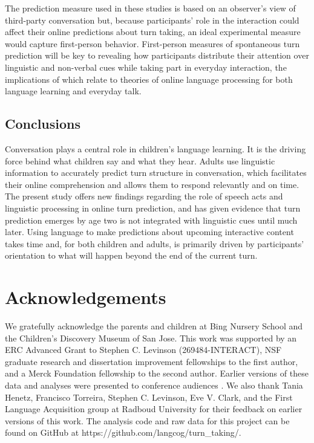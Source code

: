 \documentclass[authoryear, 12pt]{elsarticle}
\begin{document}
The prediction measure used in these studies is based on an observer's view of third-party conversation but, because participants' role in the interaction could affect their online predictions about turn taking, an ideal experimental measure would capture first-person behavior. First-person measures of spontaneous turn prediction will be key to revealing how participants distribute their attention over linguistic and non-verbal cues while taking part in everyday interaction, the implications of which relate to theories of online language processing for both language learning and everyday talk.

\subsection{Conclusions}

Conversation plays a central role in children's language learning. It is the driving force behind what children say and what they hear. Adults use linguistic information to accurately predict turn structure in conversation, which facilitates their online comprehension and allows them to respond relevantly and on time. The present study offers new findings regarding the role of speech acts and linguistic processing in online turn prediction, and has given evidence that turn prediction emerges by age two is not integrated with linguistic cues until much later. Using language to make predictions about upcoming interactive content takes time and, for both children and adults, is primarily driven by participants' orientation to what will happen beyond the end of the current turn.

\section*{Acknowledgements}

We gratefully acknowledge the parents and children at Bing Nursery School and the Children's Discovery Museum of San Jose. This work was supported by an ERC Advanced Grant to Stephen C. Levinson (269484-INTERACT), NSF graduate research and dissertation improvement fellowships to the first author, and a Merck Foundation fellowship to the second author. Earlier versions of these data and analyses were presented to conference audiences \citep{casillas2012, casillas2013}. We also thank Tania Henetz, Francisco Torreira, Stephen C. Levinson, Eve V. Clark, and the First Language Acquisition group at Radboud University for their feedback on earlier versions of this work. The analysis code and raw data for this project can be found on GitHub at https://github.com/langcog/turn\_taking/.
\end{document}
